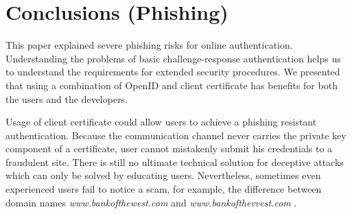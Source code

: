 \documentclass[english,gradu]{tktltiki}
\begin{document}









\section{Conclusions (Phishing)}

                 This paper explained severe phishing risks for online authentication. Understanding the problems of basic challenge-response authentication helps us to understand the requirements for extended security procedures. We presented that using a combination of OpenID and client certificate has benefits for both the users and the developers.

                 Usage of client certificate could allow users to achieve a phishing resistant authentication. Because the communication channel never carries the private key component of a certificate, user cannot mistakenly submit his credentials to a fraudulent site. There is still no ultimate technical solution for deceptive attacks which can only be solved by educating users. Nevertheless, sometimes even experienced users fail to notice a scam, for example, the difference between domain names
           \emph{www.bankofthewest.com} and \emph{www.bankofthevvest.com} \cite{why_phishing_works_06}.
\end{document}
